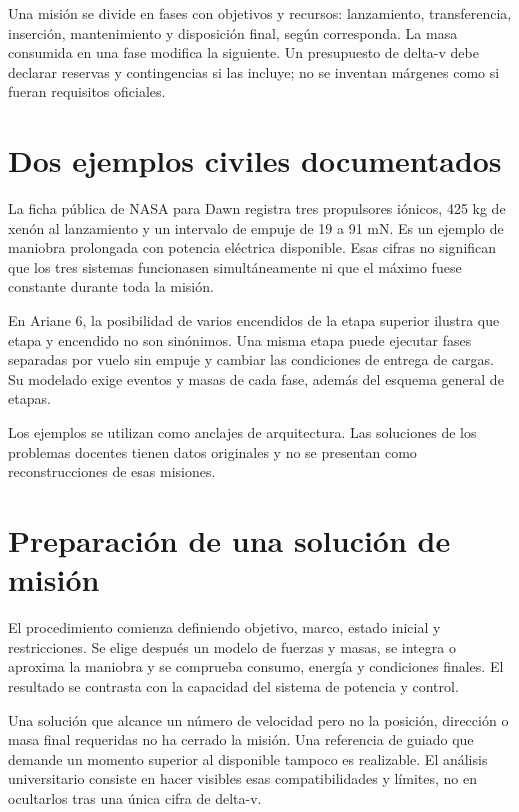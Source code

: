 Una misión se divide en fases con objetivos y recursos: lanzamiento, transferencia, inserción, mantenimiento y disposición final, según corresponda. La masa consumida en una fase modifica la siguiente. Un presupuesto de delta-v debe declarar reservas y contingencias si las incluye; no se inventan márgenes como si fueran requisitos oficiales.
\section{Dos ejemplos civiles documentados}
La ficha pública de NASA para Dawn registra tres propulsores iónicos, 425 kg de xenón al lanzamiento y un intervalo de empuje de 19 a 91 mN. Es un ejemplo de maniobra prolongada con potencia eléctrica disponible. Esas cifras no significan que los tres sistemas funcionasen simultáneamente ni que el máximo fuese constante durante toda la misión.\cite{DAWN}

En Ariane 6, la posibilidad de varios encendidos de la etapa superior ilustra que etapa y encendido no son sinónimos. Una misma etapa puede ejecutar fases separadas por vuelo sin empuje y cambiar las condiciones de entrega de cargas. Su modelado exige eventos y masas de cada fase, además del esquema general de etapas.\cite{ARIANE}

Los ejemplos se utilizan como anclajes de arquitectura. Las soluciones de los problemas docentes tienen datos originales y no se presentan como reconstrucciones de esas misiones.
\section{Preparación de una solución de misión}
El procedimiento comienza definiendo objetivo, marco, estado inicial y restricciones. Se elige después un modelo de fuerzas y masas, se integra o aproxima la maniobra y se comprueba consumo, energía y condiciones finales. El resultado se contrasta con la capacidad del sistema de potencia y control.

Una solución que alcance un número de velocidad pero no la posición, dirección o masa final requeridas no ha cerrado la misión. Una referencia de guiado que demande un momento superior al disponible tampoco es realizable. El análisis universitario consiste en hacer visibles esas compatibilidades y límites, no en ocultarlos tras una única cifra de delta-v.
